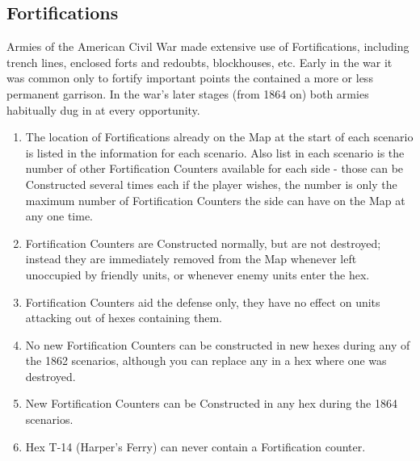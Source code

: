 \subsection{Fortifications}

Armies of the American Civil War made extensive use of Fortifications, including trench lines, enclosed forts and redoubts, blockhouses, etc. Early in the war it was common only to fortify important points the contained a more or less permanent garrison. In the war's later stages (from 1864 on) both armies habitually dug in at every opportunity.

\begin{enumerate}
  \item The location of Fortifications already on the Map at the start of each scenario is listed in the information for each scenario. Also list in each scenario is the number of other Fortification Counters available for each side - those can be Constructed several times each if the player wishes, the number is only the maximum number of Fortification Counters the side can have on the Map at any one time.

  \item Fortification Counters are Constructed normally, but are not destroyed; instead they are immediately removed from the Map whenever left unoccupied by friendly units, or whenever enemy units enter the hex.

  \item Fortification Counters aid the defense only, they have no effect on units attacking out of hexes containing them.

  \item No new Fortification Counters can be constructed in new hexes during any of the 1862 scenarios, although you can replace any in a hex where one was destroyed.

  \item New Fortification Counters can be Constructed in any hex during the 1864 scenarios.

  \item Hex T-14 (Harper's Ferry) can never contain a Fortification counter.
\end{enumerate}